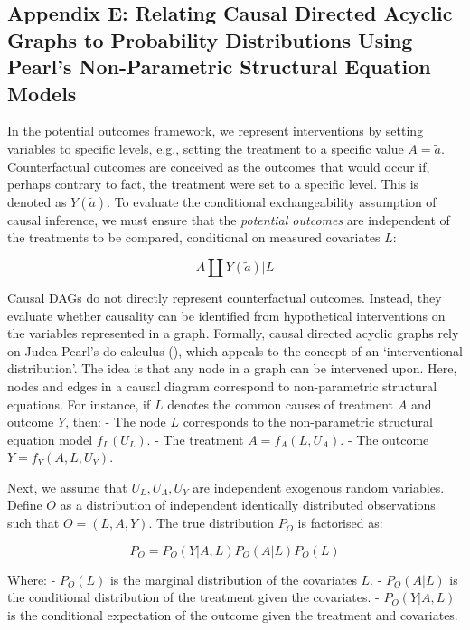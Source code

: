 \documentclass[
  single column]{article}
\begin{document}
\newpage{}

\subsection{Appendix E: Relating Causal Directed Acyclic Graphs to
Probability Distributions Using Pearl's Non-Parametric Structural
Equation Models}\label{id-app-E}

In the potential outcomes framework, we represent interventions by
setting variables to specific levels, e.g., setting the treatment to a
specific value \(A = \tilde{a}\). Counterfactual outcomes are conceived
as the outcomes that would occur if, perhaps contrary to fact, the
treatment were set to a specific level. This is denoted as
\(Y(\tilde{a})\). To evaluate the conditional exchangeability assumption
of causal inference, we must ensure that the \emph{potential outcomes}
are independent of the treatments to be compared, conditional on
measured covariates \(L\):

\[
A \coprod Y(\tilde{a})|L
\]

Causal DAGs do not directly represent counterfactual outcomes. Instead,
they evaluate whether causality can be identified from hypothetical
interventions on the variables represented in a graph. Formally, causal
directed acyclic graphs rely on Judea Pearl's do-calculus
(), which appeals to the concept of
an `interventional distribution'. The idea is that any node in a graph
can be intervened upon. Here, nodes and edges in a causal diagram
correspond to non-parametric structural equations. For instance, if
\(L\) denotes the common causes of treatment \(A\) and outcome \(Y\),
then: - The node \(L\) corresponds to the non-parametric structural
equation model \(f_L(U_L)\). - The treatment \(A = f_A(L, U_A)\). - The
outcome \(Y = f_Y(A, L, U_Y)\).

Next, we assume that \(U_L, U_A, U_Y\) are independent exogenous random
variables. Define \(O\) as a distribution of independent identically
distributed observations such that \(O = (L, A, Y)\). The true
distribution \(P_O\) is factorised as:

\[
P_O = P_O(Y|A, L) P_O(A|L) P_O(L)
\]

Where: - \(P_O(L)\) is the marginal distribution of the covariates
\(L\). - \(P_O(A|L)\) is the conditional distribution of the treatment
given the covariates. - \(P_O(Y|A, L)\) is the conditional expectation
of the outcome given the treatment and covariates.
\end{document}
